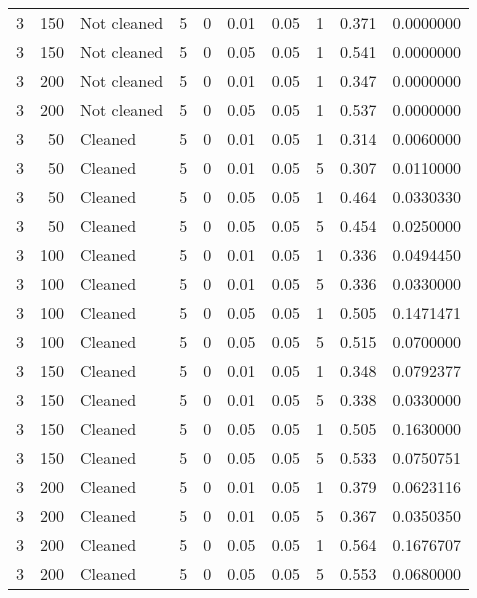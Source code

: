 \begin{table}
{{\begin{tabular}{rrlrrrrrrr}
\hspace{1em}3 & 150 & Not cleaned & 5 & 0 & 0.01 & 0.05 & 1 & 0.371 & 0.0000000\\
\hspace{1em}3 & 150 & Not cleaned & 5 & 0 & 0.05 & 0.05 & 1 & 0.541 & 0.0000000\\
\hspace{1em}3 & 200 & Not cleaned & 5 & 0 & 0.01 & 0.05 & 1 & 0.347 & 0.0000000\\
\hspace{1em}3 & 200 & Not cleaned & 5 & 0 & 0.05 & 0.05 & 1 & 0.537 & 0.0000000\\
\hspace{1em}3 & 50 & Cleaned & 5 & 0 & 0.01 & 0.05 & 1 & 0.314 & 0.0060000\\
\hspace{1em}3 & 50 & Cleaned & 5 & 0 & 0.01 & 0.05 & 5 & 0.307 & 0.0110000\\
\hspace{1em}3 & 50 & Cleaned & 5 & 0 & 0.05 & 0.05 & 1 & 0.464 & 0.0330330\\
\hspace{1em}3 & 50 & Cleaned & 5 & 0 & 0.05 & 0.05 & 5 & 0.454 & 0.0250000\\
\hspace{1em}3 & 100 & Cleaned & 5 & 0 & 0.01 & 0.05 & 1 & 0.336 & 0.0494450\\
\hspace{1em}3 & 100 & Cleaned & 5 & 0 & 0.01 & 0.05 & 5 & 0.336 & 0.0330000\\
\hspace{1em}3 & 100 & Cleaned & 5 & 0 & 0.05 & 0.05 & 1 & 0.505 & 0.1471471\\
\hspace{1em}3 & 100 & Cleaned & 5 & 0 & 0.05 & 0.05 & 5 & 0.515 & 0.0700000\\
\hspace{1em}3 & 150 & Cleaned & 5 & 0 & 0.01 & 0.05 & 1 & 0.348 & 0.0792377\\
\hspace{1em}3 & 150 & Cleaned & 5 & 0 & 0.01 & 0.05 & 5 & 0.338 & 0.0330000\\
\hspace{1em}3 & 150 & Cleaned & 5 & 0 & 0.05 & 0.05 & 1 & 0.505 & 0.1630000\\
\hspace{1em}3 & 150 & Cleaned & 5 & 0 & 0.05 & 0.05 & 5 & 0.533 & 0.0750751\\
\hspace{1em}3 & 200 & Cleaned & 5 & 0 & 0.01 & 0.05 & 1 & 0.379 & 0.0623116\\
\hspace{1em}3 & 200 & Cleaned & 5 & 0 & 0.01 & 0.05 & 5 & 0.367 & 0.0350350\\
\hspace{1em}3 & 200 & Cleaned & 5 & 0 & 0.05 & 0.05 & 1 & 0.564 & 0.1676707\\
\hspace{1em}3 & 200 & Cleaned & 5 & 0 & 0.05 & 0.05 & 5 & 0.553 & 0.0680000\\
\bottomrule
\end{tabular}
}}
 \end{table}
